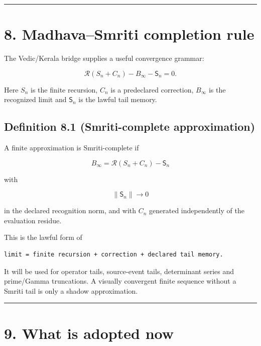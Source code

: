 \begin{center}\rule{0.5\linewidth}{0.5pt}\end{center}

\hypertarget{madhavasmriti-completion-rule}{%
\section{8. Madhava--Smriti completion rule}\label{madhavasmriti-completion-rule}}

The Vedic/Kerala bridge supplies a useful convergence grammar:

\[
\mathcal R(S_n+C_n)-B_\infty-\mathsf S_n=0.
\]

Here \(S_n\) is the finite recursion, \(C_n\) is a predeclared correction,
\(B_\infty\) is the recognized limit and \(\mathsf S_n\) is the lawful tail
memory.

\hypertarget{definition-8.1-smriti-complete-approximation}{%
\subsection{Definition 8.1 (Smriti-complete approximation)}\label{definition-8.1-smriti-complete-approximation}}

A finite approximation is Smriti-complete if

\[
\boxed{
B_\infty
=
\mathcal R(S_n+C_n)-\mathsf S_n
}
\]

with

\[
\|\mathsf S_n\|\longrightarrow0
\]

in the declared recognition norm, and with \(C_n\) generated independently of
the evaluation residue.

This is the lawful form of

\begin{verbatim}
limit = finite recursion + correction + declared tail memory.
\end{verbatim}

It will be used for operator tails, source-event tails, determinant series and
prime/Gamma truncations. A visually convergent finite sequence without a
Smriti tail is only a shadow approximation.

\begin{center}\rule{0.5\linewidth}{0.5pt}\end{center}

\hypertarget{what-is-adopted-now}{%
\section{9. What is adopted now}\label{what-is-adopted-now}}

